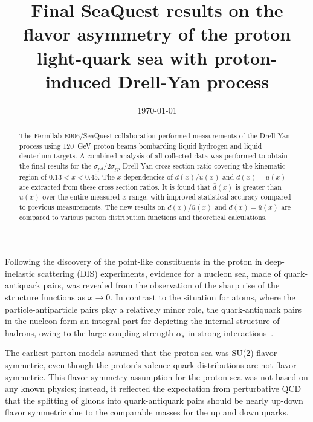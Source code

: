 \documentclass[reprint,aps,unsortedaddress,superscriptaddress,prl,floatfix,showpacs,linenumbers]{revtex4-2}
\begin{document}
\title{Final SeaQuest results on the flavor asymmetry of the proton light-quark sea with proton-induced Drell-Yan process}


\date{\today}

\begin{abstract}
	The Fermilab E906/SeaQuest collaboration performed measurements of the Drell-Yan process using
	\SI{120}{\GeV} proton beams bombarding liquid hydrogen and liquid deuterium targets.
	A combined analysis of all collected data was performed to obtain the final results for the $\sigma_{pd}/2\sigma_{pp}$ Drell-Yan cross
	section ratio covering the kinematic region of $0.13 < x < 0.45$.
	The $x$-dependencies of $\bar{d}\left(x\right) / \bar{u}\left(x\right)$ and $\bar{d}\left(x\right) - \bar{u}\left(x\right)$
	are extracted from these cross section ratios.
	It is found that $\bar{d}\left(x\right)$ is greater than $\bar{u}\left(x\right)$ over the entire measured $x$
	range, with improved statistical accuracy compared to previous measurements.
	The new results on $\bar{d}\left(x\right) / \bar{u}\left(x\right)$ and $\bar{d}\left(x\right) - \bar{u}\left(x\right)$
	are compared to various parton distribution functions and theoretical calculations.
\end{abstract}


\maketitle

Following the discovery of the point-like constituents in the proton in
deep-inelastic scattering (DIS) experiments, evidence for a nucleon sea,
made of quark-antiquark pairs,
was revealed from the observation of the sharp rise of the structure
functions as $x \to 0$. In contrast to the situation for atoms, where
the particle-antiparticle pairs play a relatively minor role, the
quark-antiquark pairs in the nucleon form an integral part for
depicting the internal structure of hadrons, owing to the large
coupling strength $\alpha_s$ in strong interactions~\cite{friedman1972}.

The earliest parton models assumed that the proton sea was SU(2)
flavor symmetric, even though the proton's valence quark
distributions are not flavor symmetric. This flavor symmetry assumption
for the proton sea was not based on any known physics; instead, it reflected the
expectation from perturbative QCD that the splitting of gluons
into quark-antiquark pairs should be nearly up-down flavor symmetric
due to the comparable masses for the up and down quarks.
\end{document}
